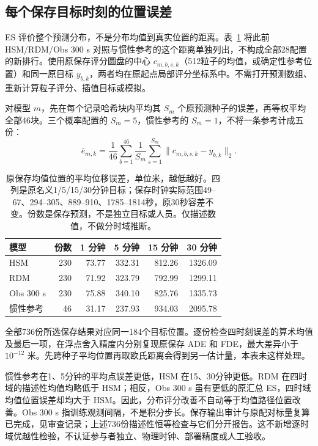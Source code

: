 \FloatBarrier
\subsection{每个保存目标时刻的位置误差}
\label{sec:point-error-horizons}
ES 评价整个预测分布，不是分布均值到真实位置的距离。表~\ref{tab:point-error-horizons} 将此前 HSM/RDM/Obs 300 s 对照与惯性参考的这个距离单独列出，不构成全部28配置的新排行。使用原保存评分圆盘的中心 $c_{m,b,s,k}$（512粒子的均值，或确定性参考位置）和同一原目标 $y_{b,k}$，两者均在原起点局部评分坐标系中。不需打开预测数组、重新计算粒子评分、插值目标或模拟。

对模型 $m$，先在每个记录哈希块内平均其 $S_m$ 个原预测种子的误差，再等权平均全部46块。三个概率配置的 $S_m=5$，惯性参考的 $S_m=1$，不将一条参考计成五份：
\begin{equation}
\bar e_{m,k}=\frac{1}{46}\sum_{b=1}^{46}
\frac{1}{S_m}\sum_{s=1}^{S_m}\lVert c_{m,b,s,k}-y_{b,k}\rVert_2.
\label{eq:point-error-horizon-mean}
\end{equation}

\begin{table}[htbp]\centering\small
\caption{原保存均值位置的平均位移误差，单位米，越低越好。四列是原名义1/5/15/30分钟目标；保存时钟实际范围49--67、294--305、889--910、1785--1814秒，原30秒容差不变。份数是保存预测，不是独立目标或人员。仅描述数值，不做分时域推断。}\label{tab:point-error-horizons}
\begin{tabular}{@{}lrrrrr@{}}\toprule
模型 & 份数 & 1 分钟 & 5 分钟 & 15 分钟 & 30 分钟\\\midrule
HSM & 230 & 73.77 & 332.31 & 812.26 & 1326.09\\
RDM & 230 & 71.92 & 323.79 & 792.99 & 1299.11\\
Obs 300 s & 230 & 75.88 & 340.10 & 825.76 & 1335.73\\
惯性参考 & 46 & 31.17 & 237.93 & 934.03 & 2095.78\\
\bottomrule\end{tabular}\end{table}

全部736份所选保存结果对应同一184个目标位置。逐份检查四时刻误差的算术均值及最后一项，在浮点舍入精度内分别复现原保存 ADE 和 FDE，最大差异小于 $10^{-12}$ 米。先跨种子平均位置再取欧氏距离会得到另一估计量，本表未这样处理。

惯性参考在1、5分钟的平均点误差更低，HSM 在15、30分钟更低。RDM 在四时域的描述性均值均略低于 HSM；相反，Obs 300 s 虽有更低的原汇总 ES，四时域均值位置误差却均大于 HSM。因此，分布评分改善不自动等于均值路径位置改善。Obs 300 s 指训练观测间隔，不是积分步长。保存输出审计与原配对标量复算已完成，见审查记录；上述736份描述性恒等检查与它们分开报告。这不新增逐时域优越性检验，不认证参与者独立、物理时钟、部署精度或人工验收。
\FloatBarrier
